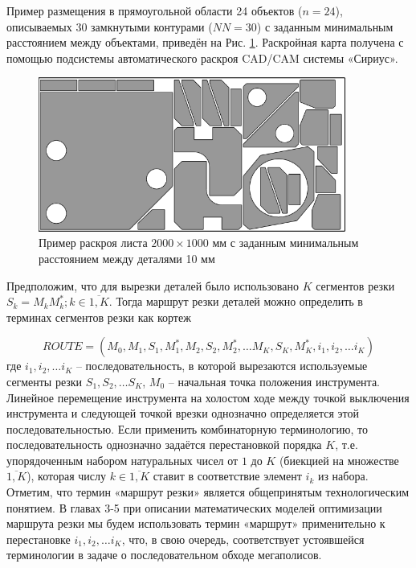 \documentclass{article}
\begin{document}
Пример размещения в прямоугольной области 24 объектов
($n=24$),
описываемых 30 замкнутыми контурами
($NN=30$)
с заданным минимальным расстоянием между объектами,
приведён на Рис. \ref{nesting}.
Раскройная карта получена с
помощью подсистемы автоматического раскроя CAD/CAM системы «Сириус».

\begin{figure}
  \begin{center}
  \includegraphics[width=0.9\textwidth]{nesting.png}
  \caption{Пример раскроя листа $2000 \times 1000$ мм с заданным минимальным расстоянием между деталями 10 мм}
  \label{nesting}
  \end{center}
\end{figure}

Предположим, что для вырезки деталей было использовано
$K$
сегментов резки
$S_k=M_kM^*_k; k \in \overline{1,K}$.
Тогда маршрут резки деталей можно определить
в терминах сегментов резки как кортеж

\begin{equation}
  ROUTE = (
    M_0, M_1, S_1, M_1^*, M_2, S_2, M_2^*, \dots M_K, S_K, M_K^*, i_1, i_2, \dots i_K
  )
  \label{tuple}
\end{equation}
где
$i_1, i_2, \dots i_K$
– последовательность, в которой вырезаются используемые сегменты резки
$S_1, S_2, \dots S_K$,
$M_0$
– начальная точка положения инструмента.
Линейное перемещение инструмента на холостом ходе
между точкой выключения инструмента и следующей точкой врезки
однозначно определяется этой последовательностью.
Если применить комбинаторную терминологию,
то последовательность однозначно задаётся перестановкой порядка
$K$,
т.е. упорядоченным набором натуральных чисел от $1$ до $K$
(биекцией на множестве $\overline{1,K}$),
которая числу
$k \in \overline{1,K}$
ставит в соответствие элемент
$i_k$ из набора.
Отметим, что термин «маршрут резки» является
общепринятым технологическим понятием.
В главах 3-5 при описании математических моделей оптимизации
маршрута резки мы будем использовать термин «маршрут»
применительно к перестановке
$i_1, i_2, \dots i_K$,
что, в свою очередь, соответствует устоявшейся
терминологии в задаче о последовательном обходе мегаполисов.
\end{document}
